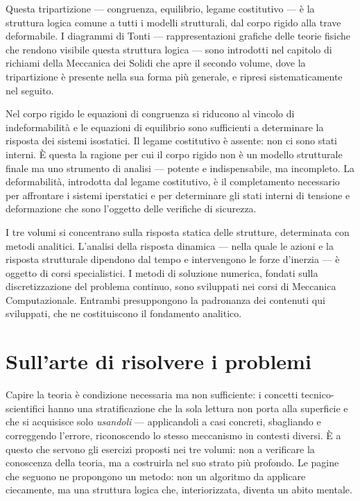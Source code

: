 Questa tripartizione --- congruenza, equilibrio, legame costitutivo --- è la struttura logica comune a tutti i modelli strutturali, dal corpo rigido alla trave deformabile. I diagrammi di Tonti --- rappresentazioni grafiche delle teorie fisiche che rendono visibile questa struttura logica --- sono introdotti nel capitolo di richiami della Meccanica dei Solidi che apre il secondo volume, dove la tripartizione è presente nella sua forma più generale, e ripresi sistematicamente nel seguito.

\begin{oss}
	Nel corpo rigido le equazioni di congruenza si riducono al vincolo di indeformabilità e le equazioni di equilibrio sono sufficienti a determinare la risposta dei sistemi isostatici. Il legame costitutivo è assente: non ci sono stati interni. È questa la ragione per cui il corpo rigido non è un modello strutturale finale ma uno strumento di analisi --- potente e indispensabile, ma incompleto. La deformabilità, introdotta dal legame costitutivo, è il completamento necessario per affrontare i sistemi iperstatici e per determinare gli stati interni di tensione e deformazione che sono l'oggetto delle verifiche di sicurezza.
\end{oss}

\begin{oss}
	I tre volumi si concentrano sulla risposta statica delle strutture, determinata con metodi analitici. L'analisi della risposta dinamica --- nella quale le azioni e la risposta strutturale dipendono dal tempo e intervengono le forze d'inerzia --- è oggetto di corsi specialistici. I metodi di soluzione numerica, fondati sulla discretizzazione del problema continuo, sono sviluppati nei corsi di Meccanica Computazionale. Entrambi presuppongono la padronanza dei contenuti qui sviluppati, che ne costituiscono il fondamento analitico.
\end{oss}

\section{Sull'arte di risolvere i problemi}

Capire la teoria è condizione necessaria ma non sufficiente: i concetti
tecnico-scientifici hanno una stratificazione che la sola lettura non porta
alla superficie e che si acquisisce solo \emph{usandoli} --- applicandoli a
casi concreti, sbagliando e correggendo l'errore, riconoscendo lo stesso
meccanismo in contesti diversi. È a questo che servono gli esercizi proposti
nei tre volumi: non a verificare la conoscenza della teoria, ma a costruirla
nel suo strato più profondo. Le pagine che seguono ne propongono un metodo:
non un algoritmo da applicare ciecamente, ma una struttura logica che,
interiorizzata, diventa un abito mentale.

